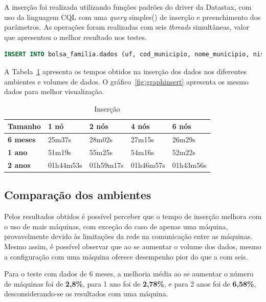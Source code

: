 A inserção foi realizada utilizando funções padrões do driver da Datastax, com uso da linguagem CQL com uma \emph{query} simples() de inserção e preenchimento dos parâmetros. As operações foram realizadas com seis \emph{threads} simultâneas, valor que apresentou o melhor resultado nos testes. 

\begin{lstlisting}[caption={Código CQL para inserção},label={lst:label},language=SQL]
INSERT INTO bolsa_familia.dados (uf, cod_municipio, nome_municipio, nis_favorecido, nome_favorecido, fonte, valor, periodo) VALUES (?, ?, ?, ?, ?, ?, ?, ?)
\end{lstlisting}

A Tabela~\ref{tb_insert} apresenta os tempos obtidos na inserção dos dados nos diferentes ambientes e volumes de dados. O gráfico~\ref{fig:graphinsert} apresenta os mesmo dados para melhor visualização.


\begin{table}[]
	\centering
	\caption{Inserção}
	\label{tb_insert}
	\begin{tabular}{lllll}
		\textbf{Tamanho}	& \textbf{1 nó} & \textbf{2 nós} & \textbf{4 nós} & \textbf{6 nós} \\ \hline
		\textbf{6 meses}    & 25m37s        & 28m02s         & 27m15s         & 26m29s         \\ \hline
		\textbf{1 ano}      & 51m19s        & 55m25s         & 54m16s         & 52m22s         \\ \hline
		\textbf{2 anos}     & 01h44m53s     & 01h59m17s      & 01h46m57s      & 01h43m56s      \\ \hline
	\end{tabular}
\end{table}

\subsection{Comparação dos ambientes}

Pelos resultados obtidos é possível perceber que o tempo de inserção melhora com o uso de mais máquinas, com exceção do caso de apenas uma máquina, provavelmente devido às limitações da rede na comunicação entre as máquinas. Mesmo assim, é possível observar que ao se aumentar o volume dos dados, mesmo a configuração com uma máquina oferece desempenho pior do que a com seis. 

Para o teste com dados de 6 meses, a melhoria média ao se aumentar o número de máquinas foi de \textbf{2,8\%}, para 1 ano foi de \textbf{2,78\%}, e para 2 anos foi de \textbf{6,58\%}, desconsiderando-se os resultados com uma máquina.

